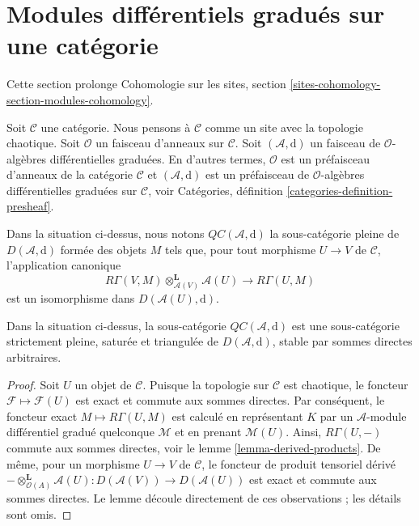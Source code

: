 \section{Modules différentiels gradués sur une catégorie}
\label{section-modules-cohomology}

\noindent
Cette section prolonge Cohomologie
sur les sites, section \ref{sites-cohomology-section-modules-cohomology}.

\medskip\noindent
Soit $\mathcal{C}$ une catégorie. Nous pensons à $\mathcal{C}$ comme un site avec
la topologie chaotique. Soit $\mathcal{O}$ un faisceau d'anneaux sur $\mathcal{C}$.
Soit $(\mathcal{A}, \text{d})$ un faisceau de
$\mathcal{O}$-algèbres différentielles graduées. En d'autres termes, $\mathcal{O}$ est
un préfaisceau d'anneaux de la catégorie $\mathcal{C}$ et
$(\mathcal{A}, \text{d})$ est un préfaisceau de
$\mathcal{O}$-algèbres différentielles graduées sur $\mathcal{C}$,
voir Catégories, définition \ref{categories-definition-presheaf}.

\begin{definition}
\label{definition-cartesian} Dans
la situation ci-dessus, nous notons
{\it $\mathit{QC}(\mathcal{A}, \text{d})$} la
sous-catégorie pleine de $D(\mathcal{A}, \text{d})$
formée des objets $M$ tels que, pour tout
morphisme $U \to V$ de $\mathcal{C}$, l'application
canonique $$
R\Gamma(V, M) \otimes_{\mathcal{A}(V)}^\mathbf{L} \mathcal{A}(U)
\longrightarrow
R\Gamma(U, M)
$$
est un isomorphisme dans $D(\mathcal{A}(U), \text{d})$.
\end{definition}

\begin{lemma}
\label{lemma-cartesian-good-sub} Dans
la situation ci-dessus, la sous-catégorie $\mathit{QC}(\mathcal{A}, \text{d})$ est
une sous-catégorie strictement pleine, saturée et triangulée de
$D(\mathcal{A}, \text{d})$, stable par sommes directes arbitraires.
\end{lemma}

\begin{proof}
Soit $U$ un objet de $\mathcal{C}$. Puisque la topologie sur
$\mathcal{C}$ est chaotique, le foncteur $\mathcal{F} \mapsto \mathcal{F}(U)$ est
exact et commute aux sommes directes. Par conséquent, le foncteur
exact $M \mapsto R\Gamma(U, M)$ est calculé en représentant $K$ par
un $\mathcal{A}$-module différentiel
gradué quelconque $\mathcal{M}$ et en prenant $\mathcal{M}(U)$.
Ainsi, $R\Gamma(U, -)$ commute aux sommes
directes, voir le lemme \ref{lemma-derived-products}.
De même, pour un morphisme $U \to V$ de $\mathcal{C}$,
le foncteur de produit
tensoriel dérivé $- \otimes_{\mathcal{O}(A)}^\mathbf{L} \mathcal{A}(U)
: D(\mathcal{A}(V)) \to D(\mathcal{A}(U))$
est exact et commute aux sommes directes. Le
lemme découle directement de ces observations ; les détails sont omis.
\end{proof}

